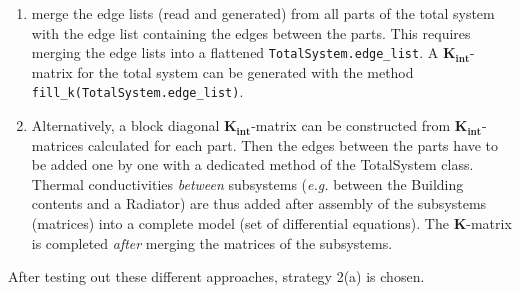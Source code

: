 \begin{footnotesize}
\begin{enumerate}
	\begin{enumerate}
		\item merge the edge lists (read and generated) from all parts of the total system with the edge list containing the edges between the parts. This requires merging  the edge lists into a flattened \texttt{TotalSystem.edge\_list}.  A $\mathbf{K_{int}}$-matrix for the total system can be generated with the method \texttt{fill\_k(TotalSystem.edge\_list)}. 
		\item Alternatively, a block diagonal $\mathbf{K_{int}}$-matrix can be constructed from $\mathbf{K_{int}}$-matrices calculated for  each part. Then the edges between the parts have to be added one by one with a dedicated method of the TotalSystem class. Thermal conductivities \emph{between} subsystems (\textit{e.g.} between the Building contents and a Radiator) are thus added after assembly of the subsystems (matrices) into a complete model (set of differential equations). The $\mathbf{K}$-matrix is completed \emph{after} merging the matrices of the subsystems. 
	\end{enumerate} 
\end{enumerate}
    
    After testing out these different approaches, strategy 2(a) is chosen.  

\end{footnotesize}


\newpage